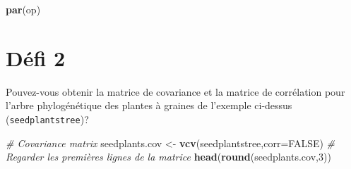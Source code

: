 \documentclass[
]{book}
\newenvironment{Shaded}{\begin{snugshade}}{\end{snugshade}}
\newcommand{\AttributeTok}[1]{\textcolor[rgb]{0.13,0.29,0.53}{#1}}
\newcommand{\CommentTok}[1]{\textcolor[rgb]{0.56,0.35,0.01}{\textit{#1}}}
\newcommand{\ConstantTok}[1]{\textcolor[rgb]{0.56,0.35,0.01}{#1}}
\newcommand{\DecValTok}[1]{\textcolor[rgb]{0.00,0.00,0.81}{#1}}
\newcommand{\FunctionTok}[1]{\textcolor[rgb]{0.13,0.29,0.53}{\textbf{#1}}}
\newcommand{\NormalTok}[1]{#1}
\newcommand{\OtherTok}[1]{\textcolor[rgb]{0.56,0.35,0.01}{#1}}
\begin{document}
\begin{Shaded}
\begin{Highlighting}[]
\FunctionTok{par}\NormalTok{(op)}
\end{Highlighting}
\end{Shaded}

\section{Défi 2}\label{duxe9fi-2}

Pouvez-vous obtenir la matrice de covariance et la matrice de corrélation pour l'arbre phylogénétique des plantes à graines de l'exemple ci-dessus (\texttt{seedplantstree})?

\begin{Shaded}
\begin{Highlighting}[]
\CommentTok{\# Covariance matrix}
\NormalTok{seedplants.cov }\OtherTok{\textless{}{-}} \FunctionTok{vcv}\NormalTok{(seedplantstree,}\AttributeTok{corr=}\ConstantTok{FALSE}\NormalTok{)}
\CommentTok{\# Regarder les premières lignes de la matrice}
\FunctionTok{head}\NormalTok{(}\FunctionTok{round}\NormalTok{(seedplants.cov,}\DecValTok{3}\NormalTok{))}
\end{Highlighting}
\end{Shaded}
\end{document}
